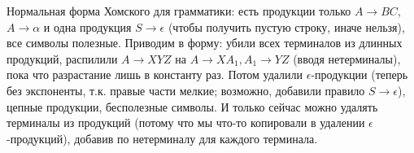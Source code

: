 	Нормальная форма Хомского для грамматики: есть продукции только $A\to BC$, $A\to \alpha$ и одна продукция $S\to\epsilon$
	(чтобы получить пустую строку, иначе нельзя), все символы полезные.
	Приводим в форму: убили всех терминалов из длинных продукций,
	распилили $A \to XYZ$ на $A\to XA_1, A_1\to YZ$ (вводя нетерминалы), пока что разрастание лишь в константу раз.
	Потом удалили $\epsilon$-продукции (теперь без экспоненты, т.к. правые части мелкие; возможно, добавили правило $S\to\epsilon$), цепные продукции, бесполезные символы.
	И только сейчас можно удалять терминалы из продукций (потому что мы что-то копировали в удалении $\epsilon$-продукций),
	добавив по нетерминалу для каждого терминала.

\section{} %
	\TODO

